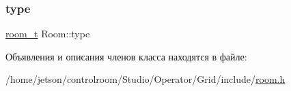 \mbox{\label{class_room_a9b8b36d17943edd1d8085bb5c2d8dbbf}} 
\subsubsection{\texorpdfstring{type}{type}}
{\footnotesize\ttfamily \hyperlink{_operator_2_grid_2include_2room_8h_aba46c5e77984ba564800a07427f8eeb1}{room\+\_\+t} Room\+::type}



Объявления и описания членов класса находятся в файле\+:\begin{DoxyCompactItemize}
\item 
/home/jetson/controlroom/\+Studio/\+Operator/\+Grid/include/\hyperlink{_operator_2_grid_2include_2room_8h}{room.\+h}\end{DoxyCompactItemize}
